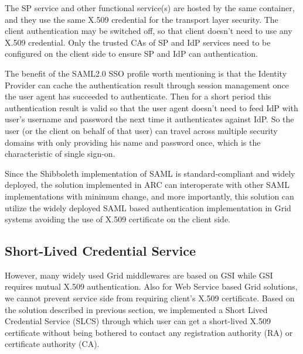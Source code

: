 \documentclass[twocolumn]{svjour3}         %
\begin{document}
The SP service and other functional service(s) are hosted by the same container, and they use the same X.509 credential for the transport layer security. The client authentication may be switched off, so that client doesn't need to use any X.509 credential. Only the trusted CAs of SP and IdP services need to be configured on the client side to ensure SP and IdP can authentication.

The benefit of the SAML2.0 SSO profile worth mentioning is that the Identity Provider can cache the authentication result through session management once the user agent has succeeded to authenticate. Then for a short period this authentication result is valid so that the user agent doesn't need to feed IdP with user's username and password the next time it authenticates against IdP. So the user (or the client on behalf of that user) can travel across multiple security domains with only providing his name and password once, which is the characteristic of single sign-on.

Since the Shibboleth implementation of SAML is standard-compliant and widely deployed, the solution implemented in ARC can interoperate with other SAML implementations with minimum change, and more importantly, this solution can utilize the widely deployed SAML based authentication implementation in Grid systems avoiding the use of X.509 certificate on the client side.

\subsection{Short-Lived Credential Service}
\label{sec:slcs}
However, many widely used Grid middlewares are based on GSI while GSI requires mutual X.509 authentication. Also for Web Service based Grid solutions, we cannot prevent service side from requiring client's X.509 certificate.  Based on the solution described in previous section, we implemented a Short Lived Credential Service (SLCS) through which user can get a short-lived X.509 certificate without being bothered to contact any registration authority (RA) or certificate authority (CA).
\end{document}
